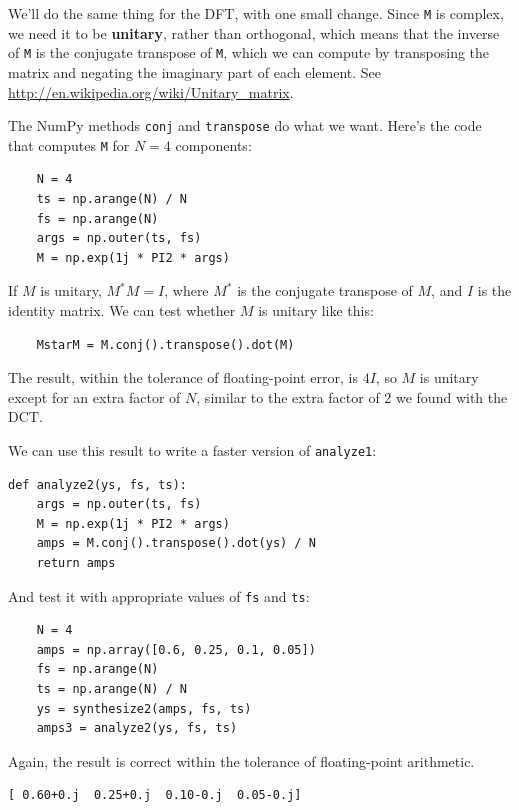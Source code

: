 \documentclass[12pt]{book}
\begin{document}
We'll do the same thing for the DFT, with one small change.
Since {\tt M} is complex, we need it to be {\bf unitary}, rather
than orthogonal, which means that the inverse of {\tt M} is
the conjugate transpose of {\tt M}, which we can compute by
transposing the matrix and negating the imaginary part of each
element.  See \url{http://en.wikipedia.org/wiki/Unitary_matrix}. 

The NumPy methods {\tt conj} and {\tt transpose} do what we
want.  Here's the code that computes {\tt M} for $N=4$ components:

\begin{verbatim}
    N = 4
    ts = np.arange(N) / N
    fs = np.arange(N)
    args = np.outer(ts, fs)
    M = np.exp(1j * PI2 * args)
\end{verbatim}

If $M$ is unitary, $M^*M = I$, where $M^*$ is the conjugate transpose
of $M$, and $I$ is the identity matrix.  We can test whether $M$
is unitary like this:

\begin{verbatim}
    MstarM = M.conj().transpose().dot(M)
\end{verbatim}

The result, within the tolerance of floating-point error, is
$4 I$, so $M$ is unitary except for an extra factor of $N$,
similar to the extra factor of 2 we found with the DCT.

We can use this result to write a faster version of {\tt analyze1}:

\begin{verbatim}
def analyze2(ys, fs, ts):
    args = np.outer(ts, fs)
    M = np.exp(1j * PI2 * args)
    amps = M.conj().transpose().dot(ys) / N
    return amps
\end{verbatim}

And test it with appropriate values of {\tt fs} and {\tt ts}:

\begin{verbatim}
    N = 4
    amps = np.array([0.6, 0.25, 0.1, 0.05])
    fs = np.arange(N)
    ts = np.arange(N) / N
    ys = synthesize2(amps, fs, ts)
    amps3 = analyze2(ys, fs, ts)
\end{verbatim}

Again, the result is correct within the tolerance of floating-point
arithmetic.

\begin{verbatim}
[ 0.60+0.j  0.25+0.j  0.10-0.j  0.05-0.j]
\end{verbatim}
\end{document}
